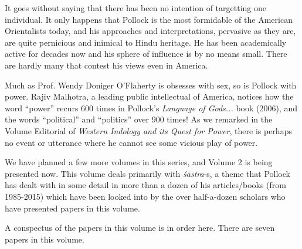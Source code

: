 It goes without saying that there has been no intention of targetting one individual. It only happens that Pollock is the most formidable of the American Orientalists today, and his approaches and interpretations, pervasive as they are, are quite pernicious and inimical to Hindu heritage. He has been academically active for decades now and his sphere of influence is by no means small. There are hardly many that contest his views even in America. 

Much as Prof. Wendy Doniger O’Flaherty is obsesses with sex, so is Pollock with power. Rajiv Malhotra, a leading public intellectual of America, notices how the word “power” recurs 600 times in Pollock’s {\sl Language of Gods...} book (2006), and the words “political” and “politics” over 900 times! As we remarked in the Volume Editorial of {\sl Western Indology and its Quest for Power}, there is perhaps no event or utterance where he cannot see some vicious play of power.

We have planned a few more volumes in this series, and Volume 2 is being presented now. This volume deals primarily with {\sl śāstra}-s, a theme that Pollock has dealt with in some detail in more than a dozen of his articles/books (from 1985-2015) which have been looked into by the over half-a-dozen scholars who have presented papers in this volume.

A conspectus of the papers in this volume is in order here. There are seven papers in this volume.

